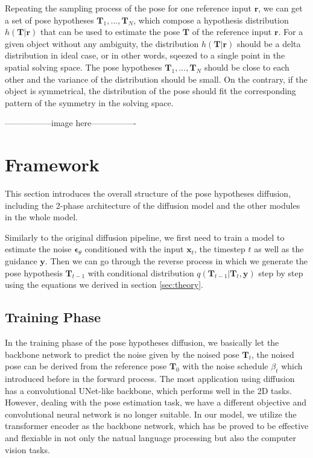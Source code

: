 \documentclass[12pt,DIV14,BCOR12mm,a4paper,footinclude=false,headinclude,parskip=half-,twoside,openright,cleardoublepage=empty,toc=index,bibliography=totoc,listof=totoc]{scrreprt}
\numberwithin{equation}{chapter}
\begin{document}
Repeating the sampling process of the pose for one reference input $\mathbf{r}$, we can get a set of pose hypotheses $\mathbf{T}_{1},...,\mathbf{T}_{N}$, which compose a hypothesis distribution $h(\mathbf{T}|\mathbf{r})$ that can be used to estimate the pose $\mathbf{T}$ of the reference input $\mathbf{r}$. For a given object without any ambiguity, the distribution $h(\mathbf{T}|\mathbf{r})$ should be a delta distribution in ideal case, or in other words, sqeezed to a single point in the spatial solving space. The pose hypotheses $\mathbf{T}_{1},...,\mathbf{T}_{N}$ should be close to each other and the variance of the distribution should be small. On the contrary, if the object is symmetrical, the distribution of the pose should fit the corresponding pattern of the symmetry in the solving space. 

-----------------image here----------------

\section{Framework}
This section introduces the overall structure of the pose hypotheses diffusion, including the 2-phase architecture of the diffusion model and the other modules in the whole model.

Similarly to the original diffusion pipeline, we first need to train a model to estimate the noise $\boldsymbol{\epsilon}_{\theta}$ conditioned with the input $\mathbf{x}_{t}$, the timestep $t$ as well as the guidance $\mathbf{y}$. Then we can go through the reverse process in which we generate the pose hypothesis $\mathbf{T}_{t-1}$ with conditional distribution $q(\mathbf{T}_{t-1}|\mathbf{T}_{t},\mathbf{y})$ step by step using the equations we derived in section \ref{sec:theory}.
\subsection{Training Phase}
In the training phase of the pose hypotheses diffusion, we basically let the backbone network to predict the noise given by the noised pose $\mathbf{T}_{t}$, the noised pose can be derived from the reference pose $\mathbf{T}_{0}$ with the noise schedule $\beta_{t}$ which introduced before in the forward process. The most application using diffusion has a convolutional UNet-like backbone\cite{ronneberger2015unet}, which performs well in the 2D tasks. However, dealing with the pose estimation task, we have a different objective and convolutional neural network is no longer suitable. In our model, we utilize the transformer encoder as the backbone network, which has be proved to be effective and flexiable in not only the natual language processing but also the computer vision tasks.
\end{document}
